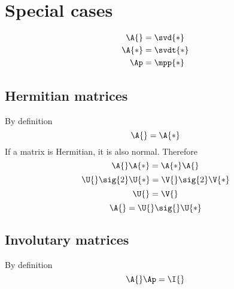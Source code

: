 \section{Special cases}

\begin{equation}
  \begin{split}
    \A{}  &= \svd{*} \\
    \A{*} &= \svdt{*} \\
    \Ap   &= \mpp{*} \\
  \end{split}
\end{equation}

\subsection{Hermitian matrices}
By definition
\begin{equation}
  \A{} = \A{*}
\end{equation}
If a matrix is Hermitian, it is also normal. Therefore
\begin{equation}
  \A{}\A{*} = \A{*}\A{}
\end{equation}
\begin{equation}
  \U{} \sig{2} \U{*} = \V{} \sig{2} \V{*}
\end{equation}
\begin{equation}
  \U{} = \V{}
\end{equation}
\begin{equation}
  \A{} = \U{} \sig{} \U{*}
\end{equation}

\subsection{Involutary matrices}
By definition
\begin{equation}
  \A{}\Ap = \I{}
\end{equation}

\endinput